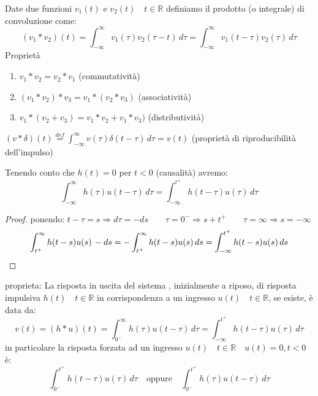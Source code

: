 \begin{definition}
	Date due funzioni $v_1(t)$ e $v_2(t) \quad t\in\mathbb{R} $ definiamo il prodotto (o integrale) di convoluzione come:
	\begin{equation*}
		(v_1 * v_2)(t) 
		= \int_{-\infty}^{\infty}v_1(\tau)v_2(\tau - t)\,d\tau 
		= \int_{-\infty}^{\infty}v_1(t - \tau)v_2(\tau )\,d\tau
	\end{equation*}
	Proprietà
	\begin{enumerate}
		\item $v_1 * v_2 = v_2 * v_1 $ (commutatività)
		\item $(v_1 * v_2) * v_3  = v_1 * (v_2 * v_3) $ (associatività)
		\item $v_1 * (v_2 + v_3)  = v_1 * v_2 + v_1 * v_3)$ (distributività)
	\end{enumerate}

\begin{oss}
	$(v *\delta)(t)\overset{def}{=} \int_{-\infty}^{\infty}v(\tau)\delta(t - \tau)\,d\tau = v(t)$ (proprietà di riproducibilità dell'impulso)
\end{oss}
\end{definition}
Tenendo conto che $h(t)=0$ per $t<0$ (causalità) avremo:
\begin{equation*}
	\int_{-\infty}^{\infty}h(\tau)u(t - \tau)\,d\tau 
	= \int_{-\infty}^{t^+}h(t - \tau)u(\tau)\,d\tau
\end{equation*}
\begin{proof}
ponendo:  $t-\tau = s \Rightarrow d\tau = - ds 
\qquad \tau = 0^-  \Rightarrow s+t^+ 
\qquad \tau=\infty \Rightarrow s = -\infty$
\[
\int_{t^+}^{\infty}h(t-s)u(s)\,-ds 
=-\int_{t^+}^{\infty}h(t-s)u(s)\,ds
=\int_{-\infty}^{t^+}h(t-s)u(s)\,ds
\qedhere
\]
\end{proof}

proprieta:
La risposta in uscita del sistema%
, inizialmente a riposo, di risposta impulsiva $h(t)\quad t\in\mathbb{R}$ in corrispondenza a un ingresso $u(t)\quad t\in\mathbb{R}$, se esiste, è data da:
\[
v(t)=(h*u)(t) = \int_{0^-}^{\infty}h(\tau)u(t - \tau)\,d\tau
= \int_{-\infty}^{t^+}h(t - \tau)u(\tau)\,d\tau
\]
in particolare la risposta forzata ad un ingresso $u(t)\quad t\in\mathbb{R} \quad u(t)=0 , t<0$ è:
\[
\int_{0^-}^{t^+}h(t - \tau)u(\tau)\,d\tau 
\quad\text{oppure}\quad
\int_{0^-}^{t^+}h(\tau)u(t - \tau)\,d\tau 
\]

